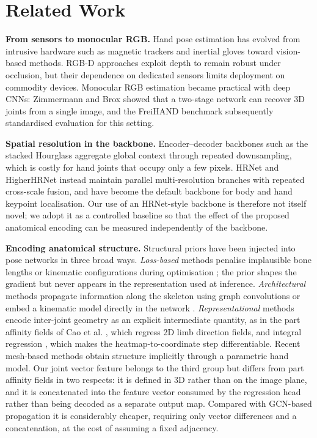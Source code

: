 \section{Related Work}
\textbf{From sensors to monocular RGB.} Hand pose estimation has evolved from intrusive hardware such as magnetic trackers \cite{ma2011magnetic} and inertial gloves \cite{galka2016inertial} toward vision-based methods. RGB-D approaches \cite{shotton2011real, rogez2014hand, mueller2017real, garcia2018firstperson} exploit depth to remain robust under occlusion, but their dependence on dedicated sensors limits deployment on commodity devices. Monocular RGB estimation became practical with deep CNNs: Zimmermann and Brox \cite{zimmermann2017learning} showed that a two-stage network can recover 3D joints from a single image, and the FreiHAND benchmark \cite{zimmermann2019freihand} subsequently standardised evaluation for this setting.

\textbf{Spatial resolution in the backbone.} Encoder--decoder backbones such as the stacked Hourglass \cite{newell2016stacked} aggregate global context through repeated downsampling, which is costly for hand joints that occupy only a few pixels. HRNet \cite{sun2019hrnet} and HigherHRNet \cite{cheng2020higherhrnet} instead maintain parallel multi-resolution branches with repeated cross-scale fusion, and have become the default backbone for body and hand keypoint localisation. Our use of an HRNet-style backbone is therefore not itself novel; we adopt it as a controlled baseline so that the effect of the proposed anatomical encoding can be measured independently of the backbone.

\textbf{Encoding anatomical structure.} Structural priors have been injected into pose networks in three broad ways. \emph{Loss-based} methods penalise implausible bone lengths or kinematic configurations during optimisation \cite{ge2019handshape, he2020graphrefinement}; the prior shapes the gradient but never appears in the representation used at inference. \emph{Architectural} methods propagate information along the skeleton using graph convolutions \cite{defferrard2016convolutional, doosti2020hopenet} or embed a kinematic model directly in the network \cite{zhou2016modelbased}. \emph{Representational} methods encode inter-joint geometry as an explicit intermediate quantity, as in the part affinity fields of Cao et al. \cite{cao2017realtime}, which regress 2D limb direction fields, and integral regression \cite{sun2018integral}, which makes the heatmap-to-coordinate step differentiable. Recent mesh-based methods \cite{moon2020i2l, chen2022mobrecon} obtain structure implicitly through a parametric hand model. Our joint vector feature belongs to the third group but differs from part affinity fields in two respects: it is defined in 3D rather than on the image plane, and it is concatenated into the feature vector consumed by the regression head rather than being decoded as a separate output map. Compared with GCN-based propagation it is considerably cheaper, requiring only vector differences and a concatenation, at the cost of assuming a fixed adjacency.

